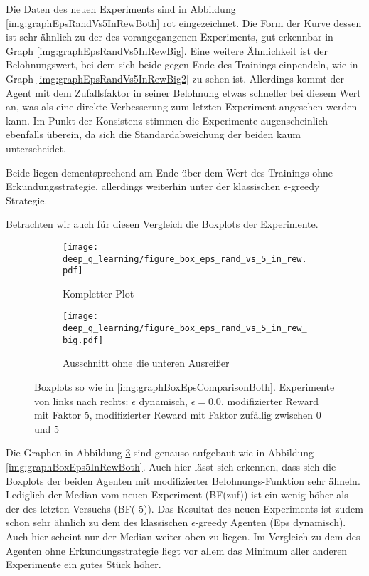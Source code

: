 Die Daten des neuen Experiments sind in Abbildung \ref{img:graphEpsRandVs5InRewBoth} rot eingezeichnet. Die Form der Kurve dessen ist sehr ähnlich zu der des vorangegangenen Experiments, gut erkennbar in Graph \ref{img:graphEpsRandVs5InRewBig}. Eine weitere Ähnlichkeit ist der Belohnungswert, bei dem sich beide gegen Ende des Trainings einpendeln, wie in Graph \ref{img:graphEpsRandVs5InRewBig2} zu sehen ist. Allerdings kommt der Agent mit dem Zufallsfaktor in seiner Belohnung etwas schneller bei diesem Wert an, was als eine direkte Verbesserung zum letzten Experiment angesehen werden kann. Im Punkt der Konsistenz stimmen die Experimente augenscheinlich ebenfalls überein, da sich die Standardabweichung der beiden kaum unterscheidet.

Beide liegen dementsprechend am Ende über dem Wert des Trainings ohne Erkundungsstrategie, allerdings weiterhin unter der klassischen $ \epsilon $-greedy Strategie.

Betrachten wir auch für diesen Vergleich die Boxplots der Experimente.

\begin{figure}[h!]
    \centering
    \begin{subfigure}[b]{0.7\textwidth}
        \texttt{[image: deep\_q\_learning/figure\_box\_eps\_rand\_vs\_5\_in\_rew.pdf]}
        \caption{Kompletter Plot}
        \label{img:graphBoxEpsRandVs5InRew}
    \end{subfigure}
    \begin{subfigure}[b]{0.7\textwidth}
        \texttt{[image: deep\_q\_learning/figure\_box\_eps\_rand\_vs\_5\_in\_rew\_big.pdf]}
        \caption{Ausschnitt ohne die unteren Ausreißer}
        \label{img:graphBoxEpsRandVs5InRewBig}
    \end{subfigure}
    \caption{Boxplots so wie in \ref{img:graphBoxEpsComparisonBoth}. Experimente von links nach rechts: $ \epsilon $ dynamisch, $ \epsilon = 0.0 $, modifizierter Reward mit Faktor 5, modifizierter Reward mit Faktor zufällig zwischen 0 und 5}
    \label{img:graphBoxEpsRandVs5InRewBoth}
\end{figure}

Die Graphen in Abbildung \ref{img:graphBoxEpsRandVs5InRewBoth} sind genauso aufgebaut wie in Abbildung \ref{img:graphBoxEps5InRewBoth}. Auch hier lässt sich erkennen, dass sich die Boxplots der beiden Agenten mit modifizierter Belohnungs-Funktion sehr ähneln. Lediglich der Median vom neuen Experiment (BF(zuf)) ist ein wenig höher als der des letzten Versuchs (BF(-5)). Das Resultat des neuen Experiments ist zudem schon sehr ähnlich zu dem des klassischen $ \epsilon $-greedy Agenten (Eps dynamisch). Auch hier scheint nur der Median weiter oben zu liegen. Im Vergleich zu dem des Agenten ohne Erkundungsstrategie liegt vor allem das Minimum aller anderen Experimente ein gutes Stück höher.

